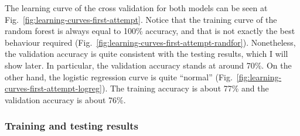 \documentclass[12pt, conference]{IEEEtran}
\begin{document}
The learning curve of the cross validation for both models can be seen at Fig.~\ref{fig:learning-curves-first-attempt}. Notice that the training curve of the random forest is always equal to 100\% accuracy, and that is not exactly the best behaviour required (Fig.~\ref{fig:learning-curves-first-attempt-randfor}). Nonetheless, the validation accuracy is quite consistent with the testing results, which I will show later. In particular, the validation accuracy stands at around 70\%. On the other hand, the logistic regression curve is quite ``normal'' (Fig.~\ref{fig:learning-curves-first-attempt-logreg}). The training accuracy is about 77\% and the validation accuracy is about 76\%.

\subsubsection{Training and testing results}
\end{document}
